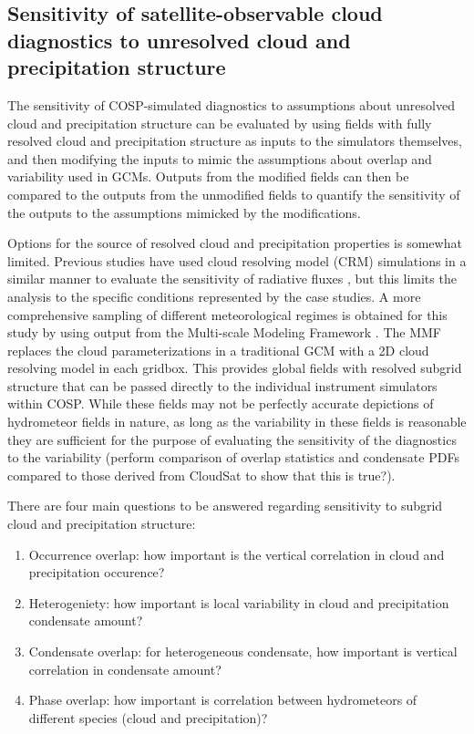 \documentclass{article}
\begin{document}
\subsection{Sensitivity of satellite-observable cloud diagnostics to unresolved cloud and precipitation structure}
The sensitivity of COSP-simulated diagnostics to assumptions about unresolved cloud and precipitation structure can be evaluated by using fields with fully resolved cloud and precipitation structure as inputs to the simulators themselves, and then modifying the inputs to mimic the assumptions about overlap and variability used in GCMs. Outputs from the modified fields can then be compared to the outputs from the unmodified fields to quantify the sensitivity of the outputs to the assumptions mimicked by the modifications.

Options for the source of resolved cloud and precipitation properties is somewhat limited. Previous studies have used cloud resolving model (CRM) simulations in a similar manner to evaluate the sensitivity of radiative fluxes \citep{barker_et_al_1999,wu_and_liang_2005}, but this limits the analysis to the specific conditions represented by the case studies. A more comprehensive sampling of different meteorological regimes is obtained for this study by using output from the Multi-scale Modeling Framework \citep[MMF;][]{randall_et_al_2003}. The MMF replaces the cloud parameterizations in a traditional GCM with a 2D cloud resolving model in each gridbox. This provides global fields with resolved subgrid structure that can be passed directly to the individual instrument simulators within COSP. While these fields may not be perfectly accurate depictions of hydrometeor fields in nature, as long as the variability in these fields is reasonable they are sufficient for the purpose of evaluating the sensitivity of the diagnostics to the variability (perform comparison of overlap statistics and condensate PDFs compared to those derived from CloudSat to show that this is true?).

There are four main questions to be answered regarding sensitivity to subgrid cloud and precipitation structure:
\begin{enumerate}
\item Occurrence overlap: how important is the vertical correlation in cloud and precipitation occurence?
\item Heterogeniety: how important is local variability in cloud and precipitation condensate amount?
\item Condensate overlap: for heterogeneous condensate, how important is vertical correlation in condensate amount?
\item Phase overlap: how important is correlation between hydrometeors of different species (cloud and precipitation)?
\end{enumerate}
\end{document}
